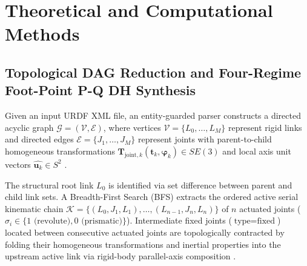 \documentclass[fleqn,10pt]{article}
\begin{document}
	\section*{Theoretical and Computational Methods}
	
	\subsection*{Topological DAG Reduction and Four-Regime Foot-Point P-Q DH Synthesis}
	
	Given an input URDF XML file, an entity-guarded parser constructs a directed acyclic graph $\mathcal{G} = (\mathcal{V}, \mathcal{E})$, where vertices $\mathcal{V} = \{L_0, \dots, L_M\}$ represent rigid links and directed edges $\mathcal{E} = \{J_1, \dots, J_M\}$ represent joints with parent-to-child homogeneous transformations $\bm{T}_{\text{joint},k}(\bm{t}_k, \bm{\varphi}_k) \in SE(3)$ and local axis unit vectors $\hat{\bm{u}_k} \in S^2$ \cite{ihab2026urdf2dt}.
	
	The structural root link $L_0$ is identified via set difference between parent and child link sets. A Breadth-First Search (BFS) extracts the ordered active serial kinematic chain $\mathcal{K} = \{(L_0, J_1, L_1), \dots, (L_{n-1}, J_n, L_n)\}$ of $n$ actuated joints ($\sigma_i \in \{1\text{ (revolute)}, 0\text{ (prismatic)}\}$). Intermediate fixed joints ($\text{type} = \text{fixed}$) located between consecutive actuated joints are topologically contracted by folding their homogeneous transformations and inertial properties into the upstream active link via rigid-body parallel-axis composition \cite{ihab2026urdf2dt}.
	
\end{document}
